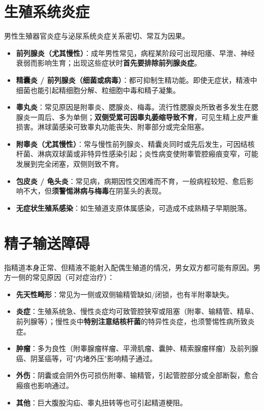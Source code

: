 \documentclass[12pt,UTF8,openany]{ctexbook}
\begin{document}
\section{生殖系统炎症}

男性生殖器官炎症与泌尿系统炎症关系密切、常互为因果。

\begin{itemize}[leftmargin=2em,itemsep=0.3em]
  \item \textbf{前列腺炎（尤其慢性）}：成年男性常见，病程某阶段可出现阳痿、早泄、神经衰弱而影响生育；出现这些症状时\textbf{首先要排除前列腺炎症}。
  \item \textbf{精囊炎 / 前列腺炎（细菌或病毒）}：都可抑制生精功能。即使无症状，精液中细菌也能引起精细胞分解、粒细胞中毒和精子凝集。
  \item \textbf{睾丸炎}：常见原因是附睾炎、腮腺炎、梅毒。流行性腮腺炎所致者多发生在腮腺炎一周后、多为单侧；\textbf{双侧受累可因睾丸萎缩导致不育}，可见生精上皮严重损害。淋球菌感染可致睾丸功能丧失、附睾部分或完全阻塞。
  \item \textbf{附睾炎（尤其慢性）}：常与慢性前列腺炎、精囊炎同时或先后发生，可因结核杆菌、淋病双球菌或非特异性感染引起；炎性病变使附睾管腔瘢痕变窄，可能发展到完全闭塞，双侧则致不育。
  \item \textbf{包皮炎 / 龟头炎}：常见病，病期因性交困难而不育，一般病程较短、愈后影响不大，但\textbf{须警惕淋病与梅毒}在阴茎头的表现。
  \item \textbf{无症状生殖系感染}：如生殖道支原体属感染，可造成不成熟精子早期脱落。
\end{itemize}

\section{精子输送障碍}

指精道本身正常、但精液不能射入配偶生殖道的情况，男女双方都可能有原因。男方一侧的常见原因（可对症治疗）：

\begin{itemize}[leftmargin=2em,itemsep=0.3em]
  \item \textbf{先天性畸形}：常见为一侧或双侧输精管缺如/闭锁，也有半附睾缺失。
  \item \textbf{炎症}：生殖系统急、慢性炎症均可致管腔狭窄或阻塞（附睾、输精管、精阜、前列腺等）；慢性炎中\textbf{特别注意结核杆菌}的特异性炎症，也须警惕性病所致炎症。
  \item \textbf{肿瘤}：多为良性（附睾腺瘤样瘤、平滑肌瘤、囊肿、精索腺瘤样瘤）及前列腺癌、阴茎癌等，可"内堵外压"影响精子通过。
  \item \textbf{外伤}：阴囊或会阴外伤可损伤附睾、输精管，引起管腔部分或全部断裂，愈合瘢痕也影响通过。
  \item \textbf{其他}：巨大腹股沟疝、睾丸扭转等也可引起精道梗阻。
\end{itemize}
\end{document}
